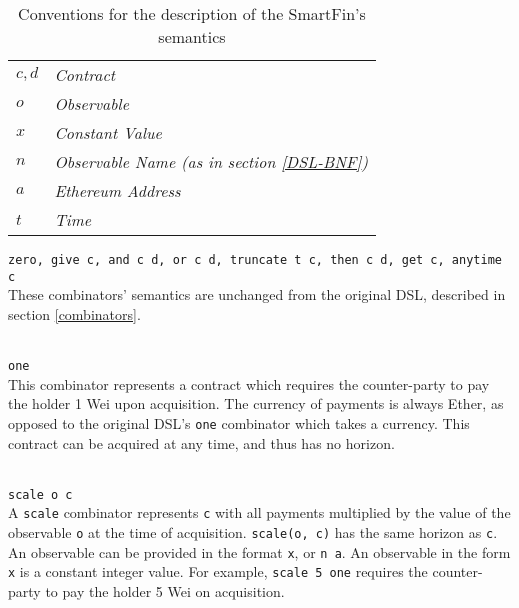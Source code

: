\begin{table}[ht]
    \begin{center}
        \begin{tabular}{|ll|}
            \hline
            $c, d$ &\textit{Contract} \\
            $o$ &\textit{Observable} \\
            $x$ &\textit{Constant Value} \\
            $n$ &\textit{Observable Name (as in section \ref{DSL-BNF})} \\
            $a$ &\textit{Ethereum Address} \\
            $t$ &\textit{Time} \\
            \hline
        \end{tabular}
        \caption{Conventions for the description of the SmartFin's semantics}
        \label{combinator-semantics-notation}
    \end{center}
\end{table}

\parbox{\textwidth}{
\texttt{zero, give c, and c d, or c d, truncate t c, then c d, get c, anytime c} \\

These combinators' semantics are unchanged from the original DSL, described in section \ref{combinators}. \\ \\

}

\parbox{\textwidth}{
\texttt{one} \\

This combinator represents a contract which requires the counter-party to pay the holder 1 Wei upon acquisition. The currency of payments is always Ether, as opposed to the original DSL's \texttt{one} combinator which takes a currency. This contract can be acquired at any time, and thus has no horizon. \\ \\
}

\texttt{scale o c} \\

A \texttt{scale} combinator represents \texttt{c} with all payments multiplied by the value of the observable \texttt{o} at the time of acquisition. \texttt{scale(o, c)} has the same horizon as \texttt{c}. \\

An observable can be provided in the format \texttt{x}, or \texttt{n a}. An observable in the form \texttt{x} is a constant integer value. For example, \texttt{scale 5 one} requires the counter-party to pay the holder 5 Wei on acquisition. \\

